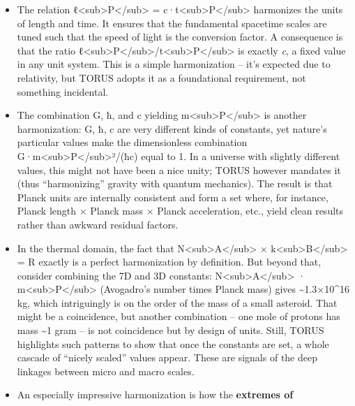 \documentclass[
]{article}
\begin{document}
\begin{itemize}
\item
  The relation ℓ\textless sub\textgreater P\textless/sub\textgreater{} =
  c·t\textless sub\textgreater P\textless/sub\textgreater{} harmonizes
  the units of length and time. It ensures that the fundamental
  spacetime scales are tuned such that the speed of light is the
  conversion factor. A consequence is that the ratio
  ℓ\textless sub\textgreater P\textless/sub\textgreater/t\textless sub\textgreater P\textless/sub\textgreater{}
  is exactly \emph{c}, a fixed value in any unit system. This is a
  simple harmonization -- it's expected due to relativity, but TORUS
  adopts it as a foundational requirement, not something incidental.
\item
  The combination G, ħ, and c yielding
  m\textless sub\textgreater P\textless/sub\textgreater{} is another
  harmonization: G, ħ, c are very different kinds of constants, yet
  nature's particular values make the dimensionless combination
  G·m\textless sub\textgreater P\textless/sub\textgreater²/(ħc) equal to
  1\hspace{0pt}. In a universe with slightly different values, this
  might not have been a nice unity; TORUS however mandates it (thus
  ``harmonizing'' gravity with quantum mechanics). The result is that
  Planck units are internally consistent and form a set where, for
  instance, Planck length × Planck mass × Planck acceleration, etc.,
  yield clean results rather than awkward residual factors.
\item
  In the thermal domain, the fact that
  N\textless sub\textgreater A\textless/sub\textgreater{} ×
  k\textless sub\textgreater B\textless/sub\textgreater{} = R exactly is
  a perfect harmonization by definition. But beyond that, consider
  combining the 7D and 3D constants:
  N\textless sub\textgreater A\textless/sub\textgreater{} ·
  m\textless sub\textgreater P\textless/sub\textgreater{} (Avogadro's
  number times Planck mass) gives \textasciitilde1.3×10\^{}16
  kg\hspace{0pt}, which intriguingly is on the order of the mass of a
  small asteroid. That might be a coincidence, but another combination
  -- one mole of protons has mass \textasciitilde1 gram -- is not
  coincidence but by design of units. Still, TORUS highlights such
  patterns to show that once the constants are set, a whole cascade of
  ``nicely scaled'' values appear. These are signals of the deep
  linkages between micro and macro scales.
\item
  An especially impressive harmonization is how the \textbf{extremes of
}
\end{itemize}
\end{document}
